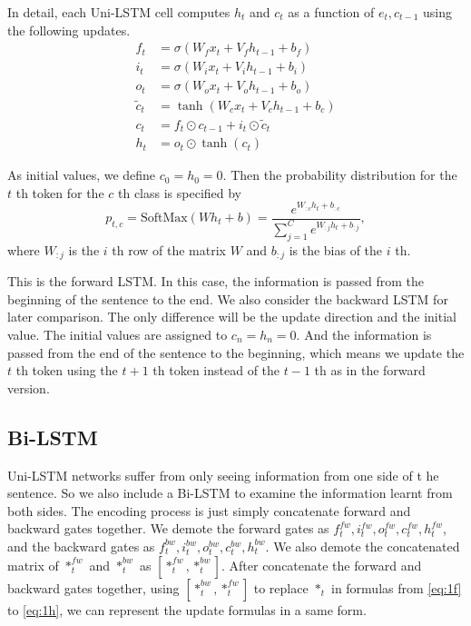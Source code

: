 \documentclass{article}
\begin{document}
In detail, each Uni-LSTM cell computes $h_t$ and $c_t$ as a function of $e_t, c_{t-1}$ using the following updates. 
\begin{align} 
f_t & = \sigma(W_f x_t + V_f h_{t - 1} + b_f) \label{eq:1f}\\
i_t & = \sigma(W_i x_t + V_i h_{t - 1} + b_i) \label{eq:1i}\\
o_t & = \sigma(W_o x_t + V_o h_{t - 1} + b_o) \label{eq:1o}\\
\tilde{c}_t & = \tanh(W_c x_t + V_c h_{t - 1} + b_c) \\
c_t & = f_t \odot c_{t - 1} + i_t \odot \tilde{c}_t \label{eq:1c}\\
h_t & = o_t \odot \tanh(c_t)\label{eq:1h}
\end{align}

As initial values, we define $c_0=h_0=0$. 
Then the probability distribution for the $t$ th token for the $c$ th class is specified by 
\begin{equation}
p_{t, c} = \text{SoftMax}(W h_t + b) = \frac{e^{W_{:c} h_t + b_{:c}}}{\sum_{j = 1} ^ C e^{W_{:j} h_t + b_{:j}}},
\end{equation}
where $W_{:j}$ is the $i$ th row of the matrix $W$ and $b_{:j}$ is the bias of the $i$ th.

This is the forward LSTM. In this case, the information is passed from the beginning of the sentence to the end. We also consider the backward LSTM for later comparison. The only difference will be the update direction and the initial value. The initial values are assigned to $c_n=h_n=0$. And the information is passed from the end of the sentence to the beginning, which means we update the $t$ th token using the $t+1$ th token instead of the $t-1$ th as in the forward version.

\subsection{Bi-LSTM}

Uni-LSTM networks suffer from only seeing information from one side of t he sentence. So we also include a Bi-LSTM to examine the information learnt from both sides. The encoding process is just simply concatenate forward and backward gates together. We demote the forward gates as $f_t^{fw}, i_t^{fw}, o_t^{fw}, c_t^{fw}, h_t^{fw}$, and the backward gates as $f_t^{bw}, i_t^{bw}, o_t^{bw}, c_t^{bw}, h_t^{bw}$. We also demote the concatenated matrix of $*_t^{fw}$ and $*_t^{bw}$ as $[*_t^{fw}, *_t^{bw}]$. After concatenate the forward and backward gates together, using $[*_t^{bw}, *_t^{fw}]$ to replace $*_t$ in formulas from \ref{eq:1f} to \ref{eq:1h}, we can represent the update formulas in a same form. 
\end{document}
